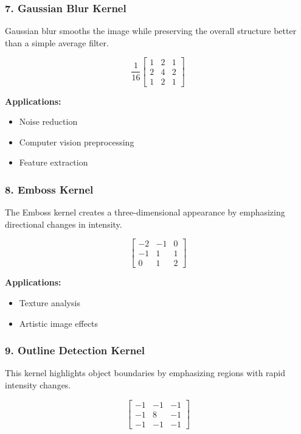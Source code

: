 \documentclass[11pt]{article}
\begin{document}
\subsubsection*{7. Gaussian Blur Kernel}

Gaussian blur smooths the image while preserving the overall structure better than a simple average filter.

\[
\frac{1}{16}
\begin{bmatrix}
1 & 2 & 1\\
2 & 4 & 2\\
1 & 2 & 1
\end{bmatrix}
\]

\textbf{Applications:}
\begin{itemize}
\item Noise reduction
\item Computer vision preprocessing
\item Feature extraction
\end{itemize}

\subsubsection*{8. Emboss Kernel}

The Emboss kernel creates a three-dimensional appearance by emphasizing directional changes in intensity.

\[
\begin{bmatrix}
-2 & -1 & 0\\
-1 & 1 & 1\\
0 & 1 & 2
\end{bmatrix}
\]

\textbf{Applications:}
\begin{itemize}
\item Texture analysis
\item Artistic image effects
\end{itemize}

\subsubsection*{9. Outline Detection Kernel}

This kernel highlights object boundaries by emphasizing regions with rapid intensity changes.

\[
\begin{bmatrix}
-1 & -1 & -1\\
-1 & 8 & -1\\
-1 & -1 & -1
\end{bmatrix}
\]
\end{document}
